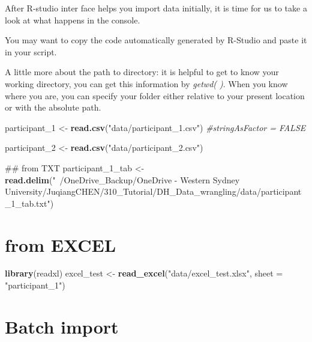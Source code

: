 \documentclass[]{book}
\newenvironment{Shaded}{\begin{snugshade}}{\end{snugshade}}
\newcommand{\KeywordTok}[1]{\textcolor[rgb]{0.13,0.29,0.53}{\textbf{#1}}}
\newcommand{\DataTypeTok}[1]{\textcolor[rgb]{0.13,0.29,0.53}{#1}}
\newcommand{\DecValTok}[1]{\textcolor[rgb]{0.00,0.00,0.81}{#1}}
\newcommand{\StringTok}[1]{\textcolor[rgb]{0.31,0.60,0.02}{#1}}
\newcommand{\CommentTok}[1]{\textcolor[rgb]{0.56,0.35,0.01}{\textit{#1}}}
\newcommand{\NormalTok}[1]{#1}
\begin{document}
After R-studio inter face helps you import data initially, it is time
for us to take a look at what happens in the console.

You may want to copy the code automatically generated by R-Studio and
paste it in your script.

A little more about the path to directory: it is helpful to get to know
your working directory, you can get this information by \emph{getwd( )}.
When you know where you are, you can specify your folder either relative
to your present location or with the absolute path.

\begin{Shaded}
\begin{Highlighting}[]
\NormalTok{participant_}\DecValTok{1}\NormalTok{ <-}\StringTok{ }\KeywordTok{read.csv}\NormalTok{(}\StringTok{"data/participant_1.csv"}\NormalTok{)}
\CommentTok{#stringAsFactor = FALSE}

\NormalTok{participant_}\DecValTok{2}\NormalTok{ <-}\StringTok{ }\KeywordTok{read.csv}\NormalTok{(}\StringTok{"data/participant_2.csv"}\NormalTok{)}

\NormalTok{## from TXT}
\NormalTok{participant_1_tab <-}\StringTok{ }\KeywordTok{read.delim}\NormalTok{(}\StringTok{"~/OneDrive_Backup/OneDrive - Western Sydney University/JuqiangCHEN/310_Tutorial/DH_Data_wrangling/data/participant_1_tab.txt"}\NormalTok{)}
\end{Highlighting}
\end{Shaded}

\section{from EXCEL}\label{from-excel}

\begin{Shaded}
\begin{Highlighting}[]
\KeywordTok{library}\NormalTok{(readxl)}
\NormalTok{excel_test <-}\StringTok{ }\KeywordTok{read_excel}\NormalTok{(}\StringTok{"data/excel_test.xlsx"}\NormalTok{, }\DataTypeTok{sheet =} \StringTok{"participant_1"}\NormalTok{)}
\end{Highlighting}
\end{Shaded}

\section{Batch import}\label{batch-import}
\end{document}
